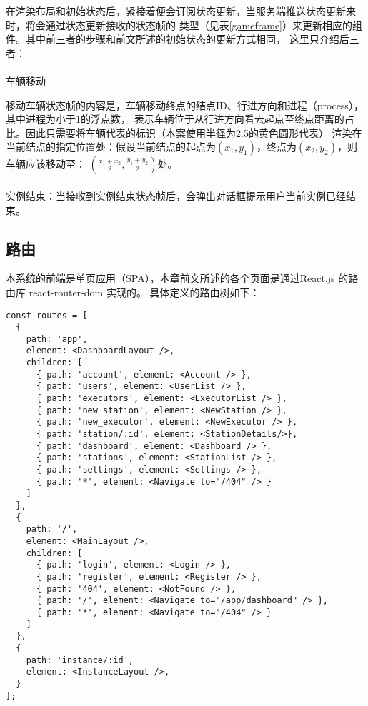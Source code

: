 在渲染布局和初始状态后，紧接着便会订阅状态更新，当服务端推送状态更新来时，将会通过状态更新接收的状态帧的
类型（见表\ref{gameframe}）来更新相应的组件。其中前三者的步骤和前文所述的初始状态的更新方式相同，
这里只介绍后三者：

\paragraph{} 车辆移动

移动车辆状态帧的内容是，车辆移动终点的结点ID、行进方向和进程（process），其中进程为小于1的浮点数，
表示车辆位于从行进方向看去起点至终点距离的占比。因此只需要将车辆代表的标识（本案使用半径为2.5的黄色圆形代表）
渲染在当前结点的指定位置处：假设当前结点的起点为$(x_1, y_1)$，终点为$(x_2, y_2)$，则车辆应该移动至：
$\displaystyle(\frac{x_1 + x_2}{2}, \frac{y_1 + y_2}{2})$处。

\paragraph{} 实例结束：当接收到实例结束状态帧后，会弹出对话框提示用户当前实例已经结束。

\subsection{路由}

本系统的前端是单页应用（SPA），本章前文所述的各个页面是通过React.js 的路由库 react-router-dom\cite{subramanian2019react} 实现的。
具体定义的路由树如下：

\begin{lstlisting}
const routes = [
  {
    path: 'app',
    element: <DashboardLayout />,
    children: [
      { path: 'account', element: <Account /> },
      { path: 'users', element: <UserList /> },
      { path: 'executors', element: <ExecutorList /> },
      { path: 'new_station', element: <NewStation /> },
      { path: 'new_executor', element: <NewExecutor /> },
      { path: 'station/:id', element: <StationDetails/>},
      { path: 'dashboard', element: <Dashboard /> },
      { path: 'stations', element: <StationList /> },
      { path: 'settings', element: <Settings /> },
      { path: '*', element: <Navigate to="/404" /> }
    ]
  },
  {
    path: '/',
    element: <MainLayout />,
    children: [
      { path: 'login', element: <Login /> },
      { path: 'register', element: <Register /> },
      { path: '404', element: <NotFound /> },
      { path: '/', element: <Navigate to="/app/dashboard" /> },
      { path: '*', element: <Navigate to="/404" /> }
    ]
  },
  {
    path: 'instance/:id',
    element: <InstanceLayout />,
  }
];
\end{lstlisting}